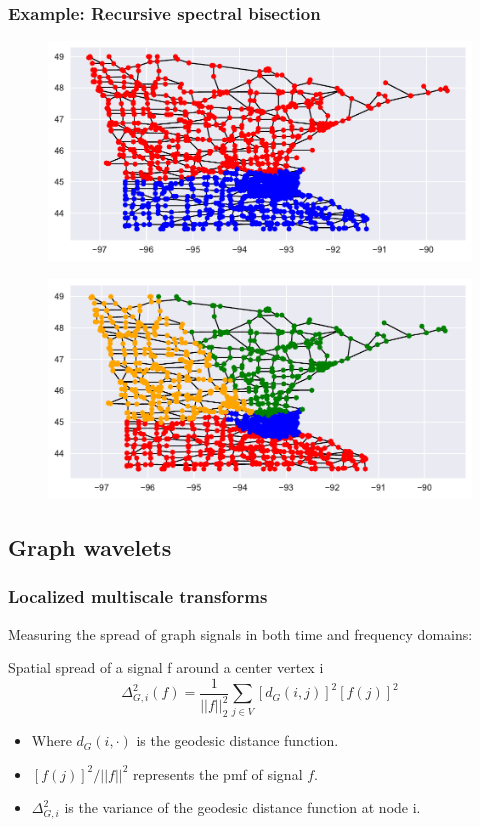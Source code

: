 \documentclass{beamer}
\begin{document}
\begin{frame}
  \frametitle{Example: Recursive spectral bisection}
\begin{figure}
\includegraphics[trim={1cm 0.7cm 0 0},clip,width=0.5\linewidth]{../img/clustering_methods_2.pdf}
\end{figure}
\begin{figure}
\includegraphics[trim={1cm 0.7cm 0 0},clip,width=0.5\linewidth]{../img/clustering_methods_3.pdf}
\end{figure}
\end{frame}

\subsection{Graph wavelets}

\begin{frame}
  \frametitle{Localized multiscale transforms}

  Measuring the spread of graph signals in both time and frequency domains:

  \begin{block}{Spatial spread of a signal f around a center vertex i}
    \begin{equation}
      \Delta_{G,i}^2(f) = \frac{1}{|| f ||_2^2} \sum_{j \in V} [d_G(i, j)]^2 [f(j)]^2
    \end{equation}
  \end{block}  

  \begin{itemize}
  \item Where $d_G(i, \cdot)$ is the geodesic distance function.
  \item $[f(j)]^2 / || f ||^2$ represents the pmf of signal $f$.
  \item $\Delta_{G, i}^2$ is the variance of the geodesic distance function at
    node i.
  \end{itemize}
\end{frame}
\end{document}
